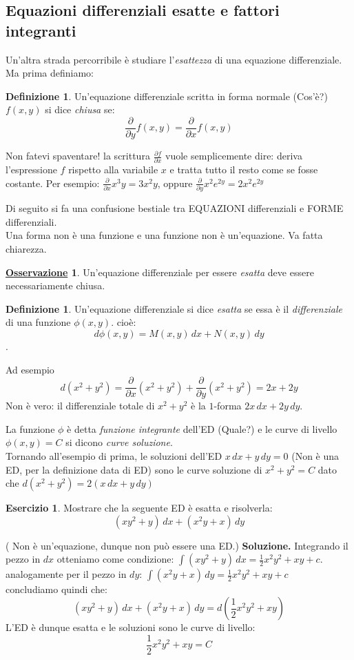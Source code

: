 \documentclass[a4paper,twoside]{article}
\theoremstyle{definition}
\newtheorem{definizione}[theorem]{Definizione}
\newtheorem{ex}[theorem]{Esercizio}
\newtheorem{oss}{\underline{\textrm Osservazione}}
\numberwithin{theorem}{section}
\begin{document}
\subsection{Equazioni differenziali esatte e fattori integranti}
Un'altra strada percorribile è studiare l'\emph{esattezza} di una equazione differenziale. Ma prima definiamo:
\begin{definizione}
    Un'equazione differenziale scritta in forma normale ({\color{red}Cos'è?}) $f(x,y)$ si dice \emph{chiusa} se: $$\frac{\partial }{\partial y}f(x,y)=\frac{\partial }{\partial x}f(x,y)$$ 
\end{definizione}
Non fatevi spaventare! la scrittura $\frac{\partial f}{\partial x}$ vuole semplicemente dire: deriva l'espressione $f$ rispetto alla variabile $x$ e tratta tutto il resto come se fosse costante. Per esempio: 
$\frac{\partial}{\partial x} x^3y= 3x^2y$, oppure $\frac{\partial}{\partial y}x^2e^{2y}=2x^2e^{2y}$

{\color{red} Di seguito si fa una confusione bestiale tra EQUAZIONI differenziali e FORME differenziali.\\ Una forma non è una funzione e una funzione non è un'equazione. Va fatta chiarezza.}

\begin{oss}
    Un'equazione differenziale per essere \emph{esatta} deve essere necessariamente chiusa.
\end{oss}
\begin{definizione}
   Un'equazione differenziale si dice \emph{esatta} se essa è il \emph{differenziale} di una funzione $\phi(x,y)$. cioè: $$d\phi(x,y)=M(x,y)\,dx + N(x,y)\, dy$$. 
\end{definizione}
 Ad esempio $$d(x^2+y^2)=\frac{\partial}{\partial x}(x^2+y^2)+\frac{\partial}{\partial y}(x^2+y^2)= 2x + 2y$$
{\color{red}Non è vero: il differenziale totale di $x^2+y^2$ è la $1$-forma $2x\,dx+2y\,dy$.} 

La funzione $\phi$ è detta \emph{funzione integrante} dell'ED ({\color{red}Quale?}) e le curve di livello $\phi(x,y)=C$ si dicono \emph{curve soluzione}. \\
Tornando all'esempio di prima, le soluzioni dell'ED $x\, dx + y\, dy= 0$ ({\color{red}Non è una ED, per la definizione data di ED}) sono le curve soluzione di $x^2+y^2=C$ dato che $d(x^2+y^2)=2(x\, dx + y\, dy)$
\begin{ex}
    Mostrare che la seguente ED è esatta e risolverla:
    $$(xy^2+y)\,dx + (x^2y+x)\,dy$$
\end{ex}
({\color{red} Non è un'equazione, dunque non può essere una ED.})
\textbf{Soluzione.}
Integrando il pezzo in $dx$ otteniamo come condizione: $\int (xy^2+y)\,dx = \frac{1}{2}x^2y^2+xy +c$. \\
analogamente per il pezzo in $dy$: $\int(x^2y+x)\,dy=\frac{1}{2}x^2y^2+xy+c$\\
concludiamo quindi che: $$(xy^2+y)\,dx + (x^2y+x)\,dy= d(\frac{1}{2}x^2y^2 +xy)$$
L'ED è dunque esatta e le soluzioni sono le curve di livello: $$\frac{1}{2}x^2y^2 +xy=C$$
\end{document}
